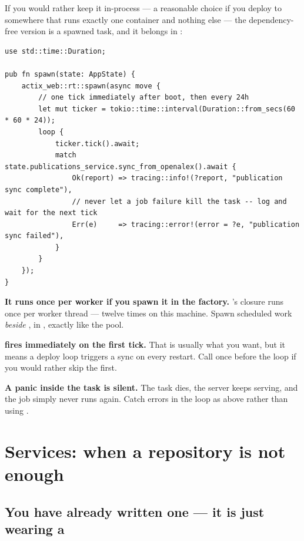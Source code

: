 If you would rather keep it in-process --- a reasonable choice if you deploy to somewhere that runs
exactly one container and nothing else --- the dependency-free version is a spawned task, and it
belongs in :

\begin{lstlisting}[style=rs,caption={\file{src/entrypoint/jobs/schedule.rs}. Note what the ordering buys.}]
use std::time::Duration;

pub fn spawn(state: AppState) {
    actix_web::rt::spawn(async move {
        // one tick immediately after boot, then every 24h
        let mut ticker = tokio::time::interval(Duration::from_secs(60 * 60 * 24));
        loop {
            ticker.tick().await;
            match state.publications_service.sync_from_openalex().await {
                Ok(report) => tracing::info!(?report, "publication sync complete"),
                // never let a job failure kill the task -- log and wait for the next tick
                Err(e)     => tracing::error!(error = ?e, "publication sync failed"),
            }
        }
    });
}
\end{lstlisting}

\begin{pitfall}
\textbf{It runs once per worker if you spawn it in the factory.} 's closure
runs once per worker thread --- twelve times on this machine. Spawn scheduled work \emph{beside}
, in , exactly like the pool.

\textbf{ fires immediately on the first tick.} That is usually what you want, but it
means a deploy loop triggers a sync on every restart. Call  once before
the loop if you would rather skip the first.

\textbf{A panic inside the task is silent.} The task dies, the server keeps serving, and the job
simply never runs again. Catch errors in the loop as above rather than using .
\end{pitfall}

\chapter{Services: when a repository is not enough}
\label{ch:services}

\section{You have already written one --- it is just wearing a }

